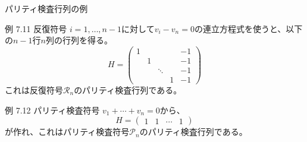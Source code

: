 \documentclass[dvipdfmx,10pt,jsarticle]{beamer}
\begin{document}
  \begin{frame}{パリティ検査行列の例}
    \begin{block}{例 7.11 反復符号}
      $i = 1, \ldots , n-1$に対して$v_i - v_n = 0$の連立方程式を使うと、以下の$n-1$行$n$列の行列を得る。
      \[ H = \begin{pmatrix}
          1 &   &   &   & -1 \\
            & 1 &   &   & -1 \\
            &   & \ddots &   & -1 \\
            &   &   & 1 & -1
        \end{pmatrix} \]
      これは反復符号$\mathcal{R}_n$のパリティ検査行列である。
    \end{block}
    \begin{block}{例 7.12 パリティ検査符号}
      $v_1 + \cdots + v_n = 0$から、
      \[ H = \begin{pmatrix} 1 & 1 & \cdots & 1 \end{pmatrix} \]
      が作れ、これはパリティ検査符号$\mathcal{P}_n$のパリティ検査行列である。
    \end{block}
  \end{frame}
\end{document}
